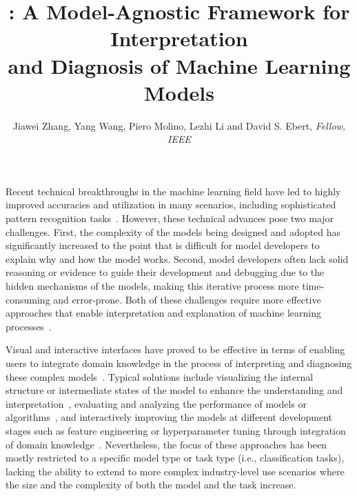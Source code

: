 \documentclass[preprint,journal]{vgtc}       %
\title{\techname: A Model-Agnostic Framework for Interpretation \\ and Diagnosis of Machine Learning Models}
\author{Jiawei Zhang, Yang Wang, Piero Molino, Lezhi Li and David S. Ebert, \textit{Fellow, IEEE}}
\begin{document}


\maketitle
Recent technical breakthroughs in the machine learning field have led to highly improved accuracies and utilization in many scenarios, including sophisticated pattern recognition tasks~\cite{lecun2015deep, abadi2016tensorflow}. However, these technical advances pose two major challenges. First, the complexity of the models being designed and adopted has significantly increased to the point that is difficult for model developers to explain why and how the model works. Second, model developers often lack solid reasoning or evidence to guide their development and debugging due to the hidden mechanisms of the models, making this iterative process more time-consuming and error-prone. Both of these challenges require more effective approaches that enable interpretation and explanation of machine learning processes~\cite{ribeiro2016should, kulesza2015principles, Krause2016interacting}.

Visual and interactive interfaces have proved to be effective in terms of enabling users to integrate domain knowledge in the process of interpreting and diagnosing these complex models~\cite{fekete2013visual, tam2017analysis, muhlbacher2014opening, amershi2014power}. Typical solutions include visualizing the internal structure or intermediate states of the model to enhance the understanding and interpretation~\cite{wongsuphasawat2018visualizing, ming2017understanding, kahng2018cti}, evaluating and analyzing the performance of models or algorithms~\cite{ren2017squares, amershi2015modeltracker, liu2018visual}, and interactively improving the models at different development stages such as feature engineering or hyperparameter tuning through integration of domain knowledge~\cite{paiva2015approach, zhao2014lovis, brooks2015featureinsight}. Nevertheless, the focus of these approaches has been mostly restricted to a specific model type or task type (i.e., classification tasks), lacking the ability to extend to more complex industry-level use scenarios where the size and the complexity of both the model and the task increase.
\end{document}
